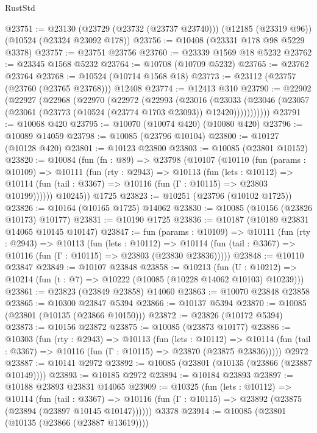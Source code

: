 \begin{lexlean}{RustStd}
\begin{coremodule}
@23751 := @23130
    (@23729 (@23732 (@23737 @23740)))
    (@12185 (@23319 @96))
    (@10524 (@23324 @23092 @178))
@23756 := @10408 (@23331 @178 @98 @5229 @3378)
@23757 := @23751 @23756
@23760 := @23339 @1569 @18 @5232
@23762 := @23345 @1568 @5232
@23764 := @10708 (@10709 @5232)
@23765 := @23762 @23764
@23768 := @10524 (@10714 @1568 @18)
@23773 := @23112 (@23757 (@23760 (@23765 @23768))) @12408
@23774 := @12413 @310
@23790 := @22902
    (@22927
      (@22968
        (@22970
          (@22972
            (@22993
              (@23016
                (@23033
                  (@23046 (@23057 (@23061 (@23773 (@10524 (@23774 @1703 @23093)) @12420)))))))))))
@23791 := @10068 @420
@23795 := @10070 (@10074 @420) (@10080 @420)
@23796 := @10089 @14059
@23798 := @10085 (@23796 @10104)
@23800 := @10127 (@10128 @420)
@23801 := @10123 @23800
@23803 := @10085 (@23801 @10152)
@23820 := @10084
    (fun (fn : @89) =>
    @23798
      (@10107
        (@10110
          (fun (params : @10109) =>
          @10111
            (fun (rty : @2943) =>
            @10113
              (fun (lets : @10112) =>
              @10114 (fun (tail : @3367) => @10116 (fun (Γ : @10115) => @23803 @10199))))))
        @10245))
    @1725
@23823 := @10251 (@23796 (@10102 @1725))
@23826 := @10164 (@10165 @1725) @14062
@23830 := @10085 (@10156 (@23826 @10173) @10177)
@23831 := @10190 @1725
@23836 := @10187 (@10189 @23831 @14065 @10145 @10147)
@23847 := fun (params : @10109) =>
  @10111
    (fun (rty : @2943) =>
    @10113
      (fun (lets : @10112) =>
      @10114 (fun (tail : @3367) => @10116 (fun (Γ : @10115) => @23803 (@23830 @23836)))))
@23848 := @10110 @23847
@23849 := @10107 @23848
@23858 := @10213
    (fun (U : @10212) => @10214 (fun (t : @7) => @10222 (@10085 (@10228 @14062 @10103) @10239)))
@23861 := @23823 (@23849 @23858) @14060
@23863 := @10070 @23848 @23858
@23865 := @10300 @23847 @5394
@23866 := @10137 @5394
@23870 := @10085 (@23801 (@10135 (@23866 @10150)))
@23872 := @23826 (@10172 @5394)
@23873 := @10156 @23872
@23875 := @10085 (@23873 @10177)
@23886 := @10303
    (fun (rty : @2943) =>
    @10113
      (fun (lets : @10112) =>
      @10114 (fun (tail : @3367) => @10116 (fun (Γ : @10115) => @23870 (@23875 @23836)))))
    @2972
@23887 := @10141 @2972
@23892 := @10085 (@23801 (@10135 (@23866 (@23887 @10149))))
@23893 := @10185 @2972
@23894 := @10184 @23893
@23897 := @10188 @23893 @23831 @14065
@23909 := @10325
    (fun (lets : @10112) =>
    @10114
      (fun (tail : @3367) =>
      @10116 (fun (Γ : @10115) => @23892 (@23875 (@23894 (@23897 @10145 @10147))))))
    @3378
@23914 := @10085 (@23801 (@10135 (@23866 (@23887 @13619))))

\end{coremodule}
\end{lexlean}
